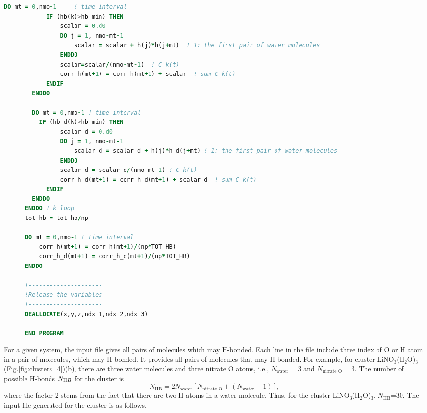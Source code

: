 \begin{lstlisting}[language=fortran]
        DO mt = 0,nmo-1     ! time interval
            IF (hb(k)>hb_min) THEN 
                scalar = 0.d0
                DO j = 1, nmo-mt-1
                    scalar = scalar + h(j)*h(j+mt)  ! 1: the first pair of water molecules
                ENDDO
                scalar=scalar/(nmo-mt-1)  ! C_k(t)
                corr_h(mt+1) = corr_h(mt+1) + scalar  ! sum_C_k(t)
            ENDIF
        ENDDO

        DO mt = 0,nmo-1 ! time interval
          IF (hb_d(k)>hb_min) THEN
                scalar_d = 0.d0
                DO j = 1, nmo-mt-1
                    scalar_d = scalar_d + h(j)*h_d(j+mt) ! 1: the first pair of water molecules
                ENDDO
                scalar_d = scalar_d/(nmo-mt-1) ! C_k(t)
                corr_h_d(mt+1) = corr_h_d(mt+1) + scalar_d  ! sum_C_k(t)
            ENDIF
        ENDDO
      ENDDO ! k loop 
      tot_hb = tot_hb/np

      DO mt = 0,nmo-1 ! time interval
          corr_h(mt+1) = corr_h(mt+1)/(np*TOT_HB)  
          corr_h_d(mt+1) = corr_h_d(mt+1)/(np*TOT_HB)  
      ENDDO
      
      !---------------------
      !Release the variables
      !---------------------
      DEALLOCATE(x,y,z,ndx_1,ndx_2,ndx_3)          

      END PROGRAM
\end{lstlisting}
%
For a given system, the input file gives all pairs of molecules which may H-bonded. Each line in the file 
include three index of O or H atom in a pair of molecules, which may H-bonded. It provides all pairs of
molecules that may H-bonded. For example, for cluster LiNO$_3$(H$_2$O)$_3$ (Fig.\space\ref{fig:clusters_4})(b), there are three 
water molecules and three nitrate O atoms, i.e., $N_{\text{water}}=3$ and $N_{\text {nitrate O}}=3$.  The number of possible H-bonds $N_{\text HB}$ for the cluster is
\begin{equation}
N_{\text{HB}}=2N_{\text{water}} [N_{\text {nitrate O}}+ (N_{\text{water}}-1)],
\label{N_HB}
\end{equation}
where the factor 2 stems from the fact that there are two H atoms in a water molecule.
Thus, for the cluster LiNO$_3$(H$_2$O)$_3$, $N_{\text{HB}}$=30. The input file generated for the cluster is as follows.
